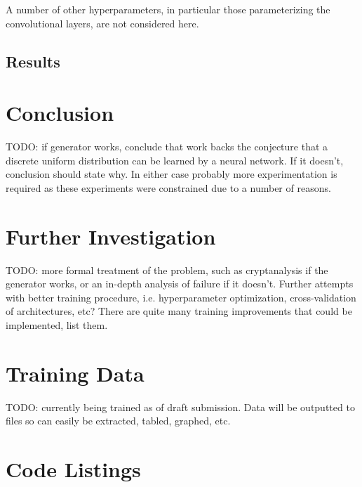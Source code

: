 \documentclass[12pt, titlepage]{report}
\theoremstyle{definition}
\begin{document}
A number of other hyperparameters, in particular those parameterizing the convolutional layers, are not considered here.


\section{Results}


\chapter{Conclusion}\label{chapter:conclusion}
TODO: if generator works, conclude that work backs the conjecture that a discrete uniform distribution can be learned by a neural network. If it doesn't, conclusion should state why. In either case probably more experimentation is required as these experiments were constrained due to a number of reasons.


\chapter{Further Investigation}
TODO: more formal treatment of the problem, such as cryptanalysis if the generator works, or an in-depth analysis of failure if it doesn't. Further attempts with better training procedure, i.e. hyperparameter optimization, cross-validation of architectures, etc? There are quite many training improvements that could be implemented, list them.






\appendix
\chapter{Training Data}
TODO: currently being trained as of draft submission. Data will be outputted to files so can easily be extracted, tabled, graphed, etc.

\chapter{Code Listings}
\end{document}

